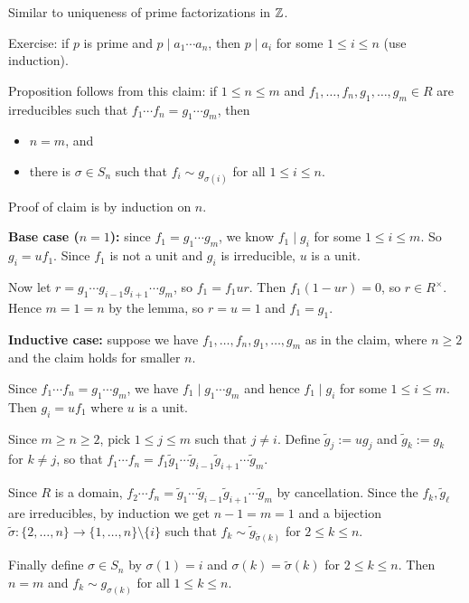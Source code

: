 \documentclass[12pt,letterpaper]{report}
\begin{document}
\begin{thmproof}
  Similar to uniqueness of prime factorizations in $\mathbb{Z}$.

  Exercise: if $p$ is prime and $p \mid a_1 \cdots a_n$, then $p \mid a_i$ for some
  $1 \leq i \leq n$ (use induction).

  Proposition follows from this claim: if $1 \leq n \leq m$ and
  $f_1, \ldots, f_n, g_1, \ldots, g_m \in R$ are irreducibles such that
  $f_1 \cdots f_n = g_1 \cdots g_m$, then
  \begin{itemize}
    \item $n = m$, and
    \item there is $\sigma \in S_n$ such that $f_i \sim g_{\sigma(i)}$ for all $1 \leq i \leq n$.
  \end{itemize}

  Proof of claim is by induction on $n$.

  \textbf{Base case ($n = 1$):} since $f_1 = g_1 \cdots g_m$, we know $f_1 \mid g_i$ for some
  $1 \leq i \leq m$.
  So $g_i = uf_1$.
  Since $f_1$ is not a unit and $g_i$ is irreducible, $u$ is a unit.

  Now let $r = g_1 \cdots g_{i - 1} g_{i + 1} \cdots g_m$, so $f_1 = f_1ur$.
  Then $f_1(1 - ur) = 0$, so $r \in R^\times$.
  Hence $m = 1 = n$ by the lemma, so $r = u = 1$ and $f_1 = g_1$.

  \textbf{Inductive case:} suppose we have $f_1, \ldots, f_n, g_1, \ldots, g_m$ as in the claim,
  where $n \geq 2$ and the claim holds for smaller $n$.

  Since $f_1 \cdots f_n = g_1 \cdots g_m$, we have $f_1 \mid g_1 \cdots g_m$ and hence
  $f_1 \mid g_i$ for some $1 \leq i \leq m$.
  Then $g_i = uf_1$ where $u$ is a unit.

  Since $m \geq n \geq 2$, pick $1 \leq j \leq m$ such that $j \neq i$.
  Define $\tilde{g}_j := ug_j$ and $\tilde{g}_k := g_k$ for $k \neq j$, so that
  $f_1 \cdots f_n = f_1 \tilde{g}_1 \cdots \tilde{g}_{i - 1} \tilde{g}_{i + 1} \cdots \tilde{g}_m$.

  Since $R$ is a domain,
  $f_2 \cdots f_n = \tilde{g}_1 \cdots \tilde{g}_{i - 1} \tilde{g}_{i + 1} \cdots \tilde{g}_m$ by
  cancellation.
  Since the $f_k, \tilde{g}_\ell$ are irreducibles, by induction we get $n - 1 = m = 1$ and a
  bijection $\tilde{\sigma} \colon \{2, \ldots, n\} \to \{1, \ldots, n\} \setminus \{i\}$ such that
  $f_k \sim \tilde{g}_{\tilde{\sigma}(k)}$ for $2 \leq k \leq n$.

  Finally define $\sigma \in S_n$ by $\sigma(1) = i$ and $\sigma(k) = \tilde{\sigma}(k)$ for
  $2 \leq k \leq n$.
  Then $n = m$ and $f_k \sim g_{\sigma(k)}$ for all $1 \leq k \leq n$.
\end{thmproof}
\end{document}
